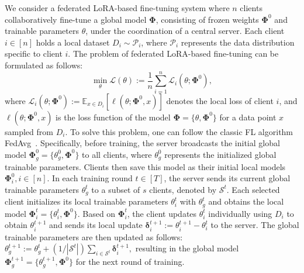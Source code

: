 \documentclass[lettersize,journal]{IEEEtran}
\newcommand{\hu}[1]{\stepcounter{todocounter}
  {\color{blue!90} #1}}
\newcommand{\ping}[1]{\textcolor{magenta}{#1}}
\begin{document}
We consider a federated LoRA-based fine-tuning system where $n$ clients collaboratively fine-tune a global model $\boldsymbol{\Phi}$, consisting of frozen weights $\boldsymbol{\Phi}^0$ and trainable parameters $\boldsymbol{\mathcal{\theta}}$, under the coordination of a central server. Each client $i\in [n]$ holds a local dataset $D_i\sim\mathcal{P}_i$, where $\mathcal{P}_i$ represents the data distribution specific to client $i$.
The problem of federated LoRA-based fine-tuning can be formulated as follows:
\begin{equation}\label{eq:ffm_obj}
\min_{\boldsymbol{\mathcal{\theta}}} \mathcal{L}(\boldsymbol{\mathcal{\theta}}) := \frac{1}{n}\sum_{i=1}^{n} \mathcal{L}_{i}(\boldsymbol{\mathcal{\theta}}; \boldsymbol{\Phi}^0),
\end{equation}
where $\mathcal{L}_{i}(\boldsymbol{\mathcal{\theta}}; \boldsymbol{\Phi}^0) := \mathbb{E}_{x \in  D_i}[\ell(\boldsymbol{\mathcal{\theta}};\boldsymbol{\Phi}^0,x)]$ denotes the local loss of client $i$, and $\ell(\boldsymbol{\mathcal{\theta}};\boldsymbol{\Phi}^0,x)$ is the loss function of the model $\boldsymbol{\Phi}=\{\boldsymbol{\mathcal{\theta}}, \boldsymbol{\Phi}^0 \}$ for a data point $x$ sampled from ${D}_i$. 
% 
To solve this problem, one can follow the classic FL algorithm FedAvg~\cite{mcmahan2017communication}. Specifically, before training, the server broadcasts the initial global model $\boldsymbol{\Phi}_g^0=\{\boldsymbol{\mathcal{\theta}}_g^0,\boldsymbol{\Phi}^0\}$ to all clients, where $\boldsymbol{\mathcal{\theta}}_g^0$ represents the initialized global trainable parameters. Clients then save this model as their initial local models $\boldsymbol{\Phi}_i^0, i\in[n]$. In each training round $t\in[T]$, the server sends its current global trainable parameters $\boldsymbol{\mathcal{\theta}}_g^t$ to a subset of $s$ clients, denoted by $\mathcal{S}^t$. Each selected client initializes its local trainable parameters $\boldsymbol{\mathcal{\theta}}_i^{t}$ with $\boldsymbol{\mathcal{\theta}}_g^t$ and obtains the local model $\boldsymbol{\Phi}_i^{t}= \{\boldsymbol{\mathcal{\theta}}_i^{t},\boldsymbol{\Phi}^0\}$. Based on $\boldsymbol{\Phi}_i^{t}$, the client updates $\boldsymbol{\mathcal{\theta}}_i^{t}$ individually using $D_i$ to obtain $\boldsymbol{\mathcal{\theta}}_i^{t+1}$ and sends its local update $ \boldsymbol{\delta}_i^{t+1} := \boldsymbol{\mathcal{\theta}}_i^{t+1} - \boldsymbol{\mathcal{\theta}}_i^t$ to the server. The global trainable parameters are then updated as follows:
$
\boldsymbol{\mathcal{\theta}}_g^{t+1} := \boldsymbol{\mathcal{\theta}}_g^t + ({1}/{|\mathcal{S}^t|})\sum_{i\in \mathcal{S}^t}\boldsymbol{\delta}_i^{t+1},
$
resulting in the global model $\boldsymbol{\Phi}_g^{t+1}=\{\boldsymbol{\mathcal{\theta}}_g^{t+1},\boldsymbol{\Phi}^0\}$ for the next round of training. 
\end{document}
